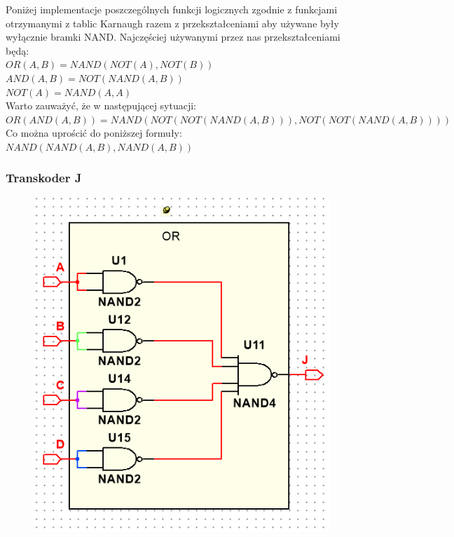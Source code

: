 \documentclass[a4paper]{article}
\begin{document}
Poniżej implementacje poszczególnych funkcji logicznych zgodnie z funkcjami otrzymanymi z tablic Karnaugh razem z przekształceniami aby używane były wyłącznie bramki NAND.
Najczęściej używanymi przez nas przekształceniami będą:\\
$OR(A,B) = NAND(NOT(A),NOT(B))$\\
$AND(A,B) = NOT(NAND(A,B))$\\
$NOT(A) = NAND(A,A)$\\
Warto zauważyć, że w następującej sytuacji:\\ 
$OR(AND(A,B)) = NAND(NOT(NOT(NAND(A,B))),NOT(NOT(NAND(A,B))))$\\
Co można uprościć do poniższej formuły:\\
$NAND(NAND(A,B),NAND(A,B))$


\subsubsection{Transkoder J}
 \begin{figure}[H]
  \centering
  \includegraphics{schemat_J.png}
\end{figure}
\end{document}
